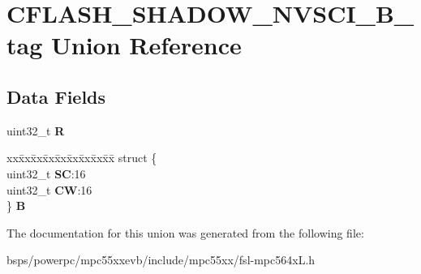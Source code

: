 \hypertarget{unionCFLASH__SHADOW__NVSCI__32B__tag}{}\section{C\+F\+L\+A\+S\+H\+\_\+\+S\+H\+A\+D\+O\+W\+\_\+\+N\+V\+S\+C\+I\+\_\+B\+\_\+tag Union Reference}
\label{unionCFLASH__SHADOW__NVSCI__32B__tag}
\subsection*{Data Fields}
\begin{DoxyCompactItemize}
\item 
\mbox{\label{unionCFLASH__SHADOW__NVSCI__32B__tag_ab855223dd1a4178518403fbfffb348ea}} 
uint32\+\_\+t {\bfseries R}
\item 
\mbox{\label{unionCFLASH__SHADOW__NVSCI__32B__tag_afd2d9e165c3095acf5366c22b3f4b6fa}} 
\begin{tabbing}
xx\=xx\=xx\=xx\=xx\=xx\=xx\=xx\=xx\=\kill
struct \{\\
\>uint32\_t {\bfseries SC}:16\\
\>uint32\_t {\bfseries CW}:16\\
\} {\bfseries B}\\

\end{tabbing}\end{DoxyCompactItemize}


The documentation for this union was generated from the following file\+:\begin{DoxyCompactItemize}
\item 
bsps/powerpc/mpc55xxevb/include/mpc55xx/fsl-\/mpc564x\+L.\+h\end{DoxyCompactItemize}
